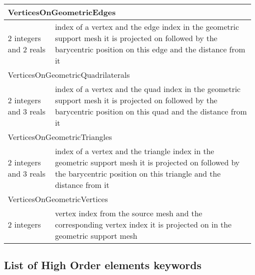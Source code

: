 \documentclass[a4paper,12pt]{article}
\begin{document}
\begin{longtable}{|m{4cm}|m{11cm}|}
\multicolumn{2}{|l|}{VerticesOnGeometricEdges} \\
\hline
2 integers and 2 reals & index of a vertex and the edge index in the geometric support mesh it is projected on followed by the barycentric position on this edge and the distance from it \\
\hline\hline

\multicolumn{2}{|l|}{VerticesOnGeometricQuadrilaterals} \\
\hline
2 integers and 3 reals & index of a vertex and the quad index in the geometric support mesh it is projected on followed by the barycentric position on this quad and the distance from it \\
\hline\hline

\multicolumn{2}{|l|}{VerticesOnGeometricTriangles} \\
\hline
2 integers and 3 reals & index of a vertex and the triangle index in the geometric support mesh it is projected on followed by the barycentric position on this triangle and the distance from it \\
\hline\hline

\multicolumn{2}{|l|}{VerticesOnGeometricVertices} \\
\hline
2 integers & vertex index from the source mesh and the corresponding vertex index it is projected on in the geometric support mesh \\
\hline

\end{longtable}



\subsection{List of High Order elements keywords}
\end{document}
